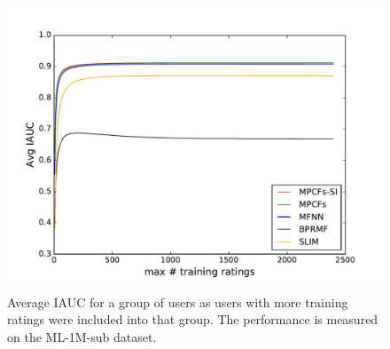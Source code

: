 \begin{figure}[p]
	\centering
	\includegraphics[width=0.7\linewidth]{./section-chapter2/figures/ml-1m_comparison_iauc.pdf}
	\caption{
		Average IAUC for a group of users as users with more training ratings were included into that group.
		The performance is measured on the ML-1M-sub dataset.}
	\label{f:ml-1m-comp-iauc}
\end{figure}

